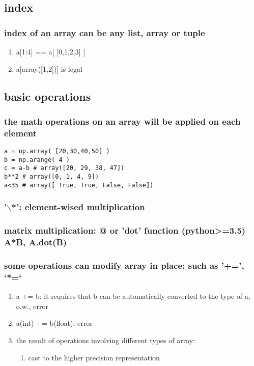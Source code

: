 \documentclass[11pt]{article}
\begin{document}
\subsection{index}
\label{sec:orgeff23e5}
\subsubsection{index of an array can be any list, array or tuple}
\label{sec:org1edd092}
\begin{enumerate}
\item a[1:4] == a[ [0,1,2,3] ]
\label{sec:orgc5a8583}
\item a[array([1,2])] is legal
\label{sec:org0b10a9c}
\end{enumerate}
\subsection{basic operations}
\label{sec:org25ba90e}
\subsubsection{the math operations on an array will be applied on each element}
\label{sec:org99b50ac}
\begin{verbatim}
a = np.array( [20,30,40,50] )
b = np.arange( 4 )
c = a-b # array([20, 29, 38, 47])
b**2 # array([0, 1, 4, 9])
a<35 # array([ True, True, False, False])
\end{verbatim}
\subsubsection{'$\backslash$*': element-wised multiplication}
\label{sec:orgd7aeffa}
\subsubsection{matrix multiplication: @ or 'dot' function (python>=3.5) A*B, A.dot(B)}
\label{sec:org7bb8099}
\subsubsection{some operations can modify array in place: such as '+=', `*=`}
\label{sec:org7da98d9}
\begin{enumerate}
\item a += b: it requires that b can be automatically converted to the type of a, o.w., error
\label{sec:orgfd3da96}
\item a(int) += b(float): error
\label{sec:orge22ef58}
\item the result of operations involving different types of array:
\label{sec:org72b270f}
\begin{enumerate}
\item cast to the higher precision representation
\label{sec:orga3a3ab7}
\end{enumerate}
\end{enumerate}
\end{document}

